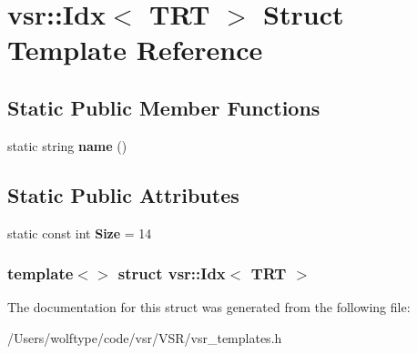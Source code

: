 \hypertarget{structvsr_1_1_idx_3_01_t_r_t_01_4}{\section{vsr\-:\-:Idx$<$ T\-R\-T $>$ Struct Template Reference}
\label{structvsr_1_1_idx_3_01_t_r_t_01_4}
}
\subsection*{Static Public Member Functions}
\begin{DoxyCompactItemize}
\item 
\hypertarget{structvsr_1_1_idx_3_01_t_r_t_01_4_a1c795348e75abed8ab0f86a4e23dba37}{static string {\bfseries name} ()}\label{structvsr_1_1_idx_3_01_t_r_t_01_4_a1c795348e75abed8ab0f86a4e23dba37}

\end{DoxyCompactItemize}
\subsection*{Static Public Attributes}
\begin{DoxyCompactItemize}
\item 
\hypertarget{structvsr_1_1_idx_3_01_t_r_t_01_4_a9b1d76965b273d46537f17dab15a335b}{static const int {\bfseries Size} = 14}\label{structvsr_1_1_idx_3_01_t_r_t_01_4_a9b1d76965b273d46537f17dab15a335b}

\end{DoxyCompactItemize}
\subsubsection*{template$<$$>$ struct vsr\-::\-Idx$<$ T\-R\-T $>$}



The documentation for this struct was generated from the following file\-:\begin{DoxyCompactItemize}
\item 
/\-Users/wolftype/code/vsr/\-V\-S\-R/vsr\-\_\-templates.\-h\end{DoxyCompactItemize}
